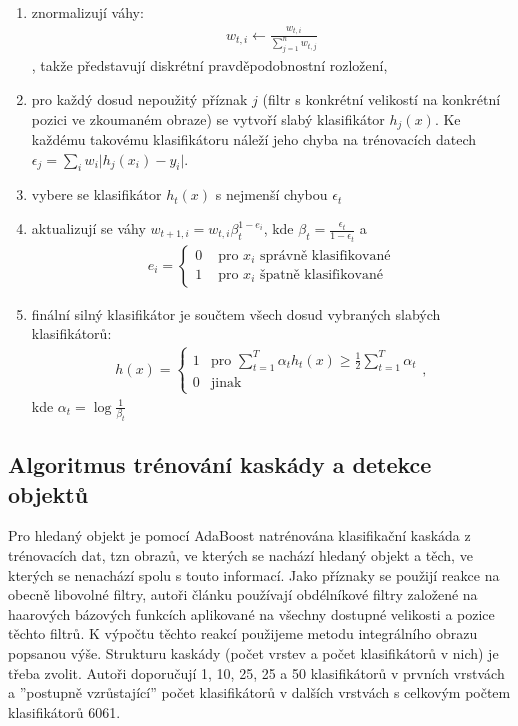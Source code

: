 	\begin{enumerate}
		\item znormalizují váhy:
		\begin{align}
			w_{t,i} \leftarrow \frac{w_{t,i}}{\sum_{j=1}^{n}w_{t,j}}
		\end{align},
		takže představují diskrétní pravděpodobnostní rozložení,
		\item pro každý dosud nepoužitý příznak $j$ (filtr s konkrétní velikostí na konkrétní pozici ve zkoumaném obraze) se vytvoří slabý klasifikátor $h_j(x)$. Ke každému takovému klasifikátoru náleží jeho chyba na trénovacích datech $\epsilon_j = \sum_{i} w_i \lvert h_j(x_i)-y_i \rvert$.
		\item vybere se klasifikátor $h_t(x)$ s nejmenší chybou $\epsilon_t$
		\item aktualizují se váhy $w_{t+1,i} = w_{t,i}\beta_t^{1-e_i}$, kde $\beta_t = \frac{\epsilon_t}{1 - \epsilon_t}$ a 
		\begin{align}
		e_i = \begin{cases}
		0 & \text{ pro } x_i \text{ správně klasifikované} \\
		1 & \text{ pro } x_i \text{ špatně klasifikované} 
		\end{cases}
		\end{align} 
		\item finální silný klasifikátor je součtem všech dosud vybraných slabých klasifikátorů:
		\begin{align}
		h(x) = \begin{cases}
				1 & \text{pro } \sum_{t=1}^{T} \alpha_t h_t(x) \geq \frac{1}{2} \sum_{t=1}^{T} \alpha_t \\
				0 & \text{jinak}
			   \end{cases},
		\end{align}
		kde $\alpha_t = \log \frac{1}{\beta_t}$
	\end{enumerate}
	
	\subsection{Algoritmus trénování kaskády a detekce objektů}
	
	Pro hledaný objekt je pomocí AdaBoost natrénována klasifikační kaskáda z trénovacích dat, tzn obrazů, ve kterých se nachází hledaný objekt a těch, ve kterých se nenachází spolu s touto informací. Jako příznaky se použijí reakce na obecně libovolné filtry, autoři článku používají obdélníkové filtry založené na haarových bázových funkcích aplikované na všechny dostupné velikosti a pozice těchto filtrů. K výpočtu těchto reakcí použijeme metodu integrálního obrazu popsanou výše. Strukturu kaskády (počet vrstev a počet klasifikátorů v nich) je třeba zvolit. Autoři doporučují 1, 10, 25, 25 a 50 klasifikátorů v prvních vrstvách a ''postupně vzrůstající''  počet klasifikátorů v dalších vrstvách s celkovým počtem klasifikátorů 6061.

